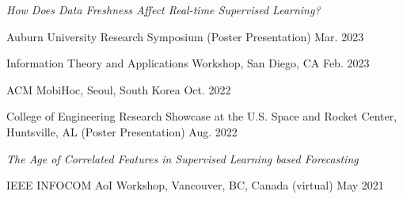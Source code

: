 \documentclass[10pt,letterpaper]{article}
\begin{document}
\textit{How Does Data Freshness Affect Real-time Supervised Learning?}
\begin{cvbullets}
  \item Auburn University Research Symposium (Poster Presentation) \hfill Mar. 2023
  \item Information Theory and Applications Workshop, San Diego, CA \hfill Feb. 2023
  \item ACM MobiHoc, Seoul, South Korea \hfill Oct. 2022
  \item College of Engineering Research Showcase at the U.S. Space and Rocket Center,
        Huntsville, AL (Poster Presentation) \hfill Aug. 2022
\end{cvbullets}
\vspace{6pt}
\textit{The Age of Correlated Features in Supervised Learning based Forecasting}
\begin{cvbullets}
  \item IEEE INFOCOM AoI Workshop, Vancouver, BC, Canada (virtual) \hfill May 2021
\end{cvbullets}
\end{document}
